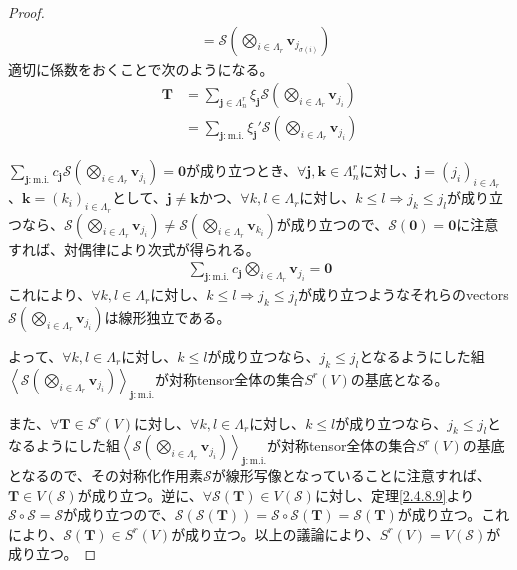\documentclass[dvipdfmx]{jsarticle}
\begin{document}
\begin{proof}
\begin{align*}
&= \mathcal{S}\left( \bigotimes_{i \in \varLambda_{r}} \mathbf{v}_{j_{\sigma(i)}} \right)
\end{align*}
適切に係数をおくことで次のようになる。
\begin{align*}
\mathbf{T} &= \sum_{\mathbf{j} \in \varLambda_{n}^{r}} {\xi_{\mathbf{j}}\mathcal{S}\left( \bigotimes_{i \in \varLambda_{r}} \mathbf{v}_{j_{i}} \right)}\\
&= \sum_{\mathbf{j}:\mathrm{m.i.} } {\xi_{\mathbf{j}}'\mathcal{S}\left( \bigotimes_{i \in \varLambda_{r}} \mathbf{v}_{j_{i}} \right)}
\end{align*}\par
$\sum_{\mathbf{j}:\mathrm{m.i.} } {c_{\mathbf{j}}\mathcal{S}\left( \bigotimes_{i \in \varLambda_{r}} \mathbf{v}_{j_{i}} \right)} = \mathbf{0}$が成り立つとき、$\forall\mathbf{j},\mathbf{k} \in \varLambda_{n}^{r}$に対し、$\mathbf{j}=\left( j_i \right)_{i\in \varLambda_r }$、$\mathbf{k}=\left( k_i \right)_{i\in \varLambda_r }$として、$\mathbf{j} \neq \mathbf{k}$かつ、$\forall k,l \in \varLambda_{r}$に対し、$k \leq l \Rightarrow j_{k} \leq j_{l}$が成り立つなら、$\mathcal{S}\left( \bigotimes_{i \in \varLambda_{r}} \mathbf{v}_{j_{i}} \right)\mathcal{\neq S}\left( \bigotimes_{i \in \varLambda_{r}} \mathbf{v}_{k_{i}} \right)$が成り立つので、$\mathcal{S}\left( \mathbf{0} \right) = \mathbf{0}$に注意すれば、対偶律により次式が得られる。
\begin{align*}
\sum_{\mathbf{j}:\mathrm{m.i.} } {c_{\mathbf{j}}\bigotimes_{i \in \varLambda_{r}} \mathbf{v}_{j_{i}}} = \mathbf{0}
\end{align*}
これにより、$\forall k,l \in \varLambda_{r}$に対し、$k \leq l \Rightarrow j_{k} \leq j_{l}$が成り立つようなそれらのvectors$\mathcal{S}\left( \bigotimes_{i \in \varLambda_{r}} \mathbf{v}_{j_{i}} \right)$は線形独立である。\par
よって、$\forall k,l \in \varLambda_{r}$に対し、$k \leq l$が成り立つなら、$j_{k} \leq j_{l}$となるようにした組$\left\langle \mathcal{S}\left( \bigotimes_{i \in \varLambda_{r}} \mathbf{v}_{j_{i}} \right) \right\rangle_{\mathbf{j}:\mathrm{m.i.} }$が対称tensor全体の集合$S^{r}(V)$の基底となる。\par
また、$\forall\mathbf{T} \in S^{r}(V)$に対し、$\forall k,l \in \varLambda_{r}$に対し、$k \leq l$が成り立つなら、$j_{k} \leq j_{l}$となるようにした組$\left\langle \mathcal{S}\left( \bigotimes_{i \in \varLambda_{r}} \mathbf{v}_{j_{i}} \right) \right\rangle_{\mathbf{j}:\mathrm{m.i.} }$が対称tensor全体の集合$S^{r}(V)$の基底となるので、その対称化作用素$\mathcal{S}$が線形写像となっていることに注意すれば、$\mathbf{T} \in V\left( \mathcal{S} \right)$が成り立つ。逆に、$\mathcal{\forall S}\left( \mathbf{T} \right) \in V\left( \mathcal{S} \right)$に対し、定理\ref{2.4.8.9}より$\mathcal{S \circ S = S}$が成り立つので、$\mathcal{S}\left( \mathcal{S}\left( \mathbf{T} \right) \right) = \mathcal{S \circ S}\left( \mathbf{T} \right) = \mathcal{S}\left( \mathbf{T} \right)$が成り立つ。これにより、$\mathcal{S}\left( \mathbf{T} \right) \in S^{r}(V)$が成り立つ。以上の議論により、$S^{r}(V) = V\left( \mathcal{S} \right)$が成り立つ。\par

\end{proof}
\end{document}

